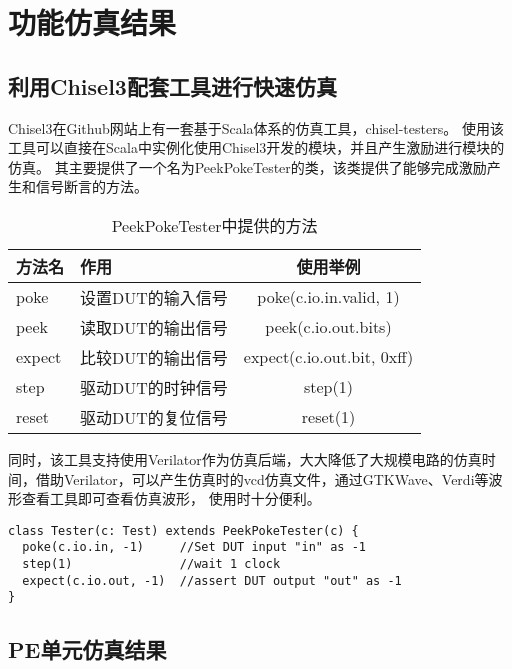 \chapter{功能仿真结果}

\section{利用Chisel3配套工具进行快速仿真}
Chisel3在Github网站上有一套基于Scala体系的仿真工具，chisel-testers。
使用该工具可以直接在Scala中实例化使用Chisel3开发的模块，并且产生激励进行模块的仿真。
其主要提供了一个名为PeekPokeTester的类，该类提供了能够完成激励产生和信号断言的方法。
\begin{table}[h] %
    \centering
    \caption{PeekPokeTester中提供的方法} %
    \begin{tabular}{l|l|c} %
    \hline  
    \hline  
    方法名 & 作用 & 使用举例 \\ %
    \hline %
    poke & 设置DUT的输入信号 & poke(c.io.in.valid, 1) \\
    \hline  
    peek & 读取DUT的输出信号 & peek(c.io.out.bits) \\
    \hline  
    expect & 比较DUT的输出信号 & expect(c.io.out.bit, 0xff) \\
    \hline  
    step & 驱动DUT的时钟信号 & step(1) \\
    \hline
    reset & 驱动DUT的复位信号 & reset(1) \\
    \hline  
    \hline  
    \end{tabular}  
\end{table}
同时，该工具支持使用Verilator作为仿真后端，大大降低了大规模电路的仿真时间，借助Verilator，可以产生仿真时的vcd仿真文件，通过GTKWave、Verdi等波形查看工具即可查看仿真波形，
使用时十分便利。
            \begin{lstlisting}[title=Chisel Test Example, frame=shadowbox]
class Tester(c: Test) extends PeekPokeTester(c) {
  poke(c.io.in, -1)     //Set DUT input "in" as -1
  step(1)               //wait 1 clock
  expect(c.io.out, -1)  //assert DUT output "out" as -1
}
            \end{lstlisting}
\section{PE单元仿真结果}

